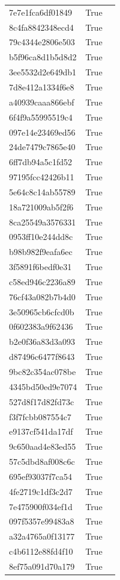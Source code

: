 \begin{tabular}{lrl}
7e7e1fca6df01849 & True &  \\
8c4fa8842348ecd4 & True &  \\
79c4344e2806e503 & True &  \\
b5f96ca8d1b5d8d2 & True &  \\
3ee5532d2e649db1 & True &  \\
7d8e412a1334f6e8 & True &  \\
a40939caaa866ebf & True &  \\
6f4f9a55995519c4 & True &  \\
097e14e23469ed56 & True &  \\
24de7479c7865e40 & True &  \\
6ff7db94a5c1fd52 & True &  \\
97195fcc42426b11 & True &  \\
5e64c8c14ab55789 & True &  \\
18a721009ab5f2f6 & True &  \\
8ca25549a3576331 & True &  \\
0953ff10e244dd8c & True &  \\
b98b982f9eafa6ec & True &  \\
3f5891f6bedf0e31 & True &  \\
c58ed946c2236a89 & True &  \\
76cf43a082b7b4d0 & True &  \\
3e50965cb6cfcd0b & True &  \\
0f602383a9f62436 & True &  \\
b2e0f36a83d3a093 & True &  \\
d87496c6477f8643 & True &  \\
9bc82c354ac078be & True &  \\
4345bd50ed9e7074 & True &  \\
527d8f17d82fd73c & True &  \\
f3f7fcbb087554c7 & True &  \\
e9137cf541da17df & True &  \\
9c650aad4e83ed55 & True &  \\
57c5dbd8af008c6c & True &  \\
695ef93037f7ca54 & True &  \\
4fe2719c1df3c2d7 & True &  \\
7e475900f034ef1d & True &  \\
097f5357e99483a8 & True &  \\
a32a4765a0f13177 & True &  \\
c4b6112e88fd4f10 & True &  \\
8ef75a091d70a179 & True &  \\

\end{tabular}
